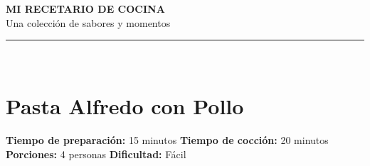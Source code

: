 \documentclass[11pt,a4paper]{article}
\begin{document}
\begin{center}
    \vspace*{2cm}
    {\Huge\bfseries\color{primarycolor} MI RECETARIO DE COCINA}\\[0.5cm]
    {\Large\color{secondarycolor} Una colección de sabores y momentos}\\[1cm]
    \rule{\linewidth}{1.5pt}\\[1.5cm]
\end{center}
\newpage

\section{Pasta Alfredo con Pollo}
\nopagebreak

\begin{tcolorbox}[colback=backgroundbox, colframe=secondarycolor, title=Información General, fonttitle=\bfseries]
    \textbf{Tiempo de preparación:} 15 minutos \hfill \textbf{Tiempo de cocción:} 20 minutos \\
    \textbf{Porciones:} 4 personas \hfill \textbf{Dificultad:} Fácil
\end{tcolorbox}

\vspace{0.5cm}
\end{document}
